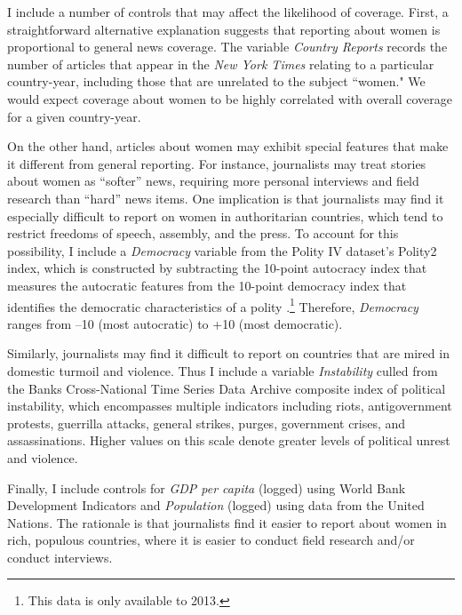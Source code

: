 \documentclass[11pt, oneside]{article}
\begin{document}
I include a number of controls that may affect the likelihood of coverage. First, a straightforward alternative explanation suggests that reporting about women is proportional to general news coverage. The variable \emph{Country Reports} records the number of articles that appear in the \emph{New York Times} relating to a particular country-year, including those that are unrelated to the subject ``women." We would expect coverage about women to be highly correlated with overall coverage for a given country-year.

On the other hand, articles about women may exhibit special features that make it different from general reporting. For instance, journalists may treat stories about women as ``softer'' news, requiring more personal interviews and field research than ``hard'' news items. One implication is that journalists may find it especially difficult to report on women in authoritarian countries, which tend to restrict freedoms of speech, assembly, and the press. To account for this possibility, I include a \emph{Democracy} variable from the Polity IV dataset's Polity2 index, which is constructed by subtracting the 10-point autocracy index that measures the autocratic features from the 10-point democracy index that identifies the democratic characteristics of a polity \cite{marshall2012}.\footnote{\hspace{5}This data is only available to 2013.} Therefore, \emph{Democracy} ranges from --10 (most autocratic) to +10 (most democratic). 

Similarly, journalists may find it difficult to report on countries that are mired in domestic turmoil and violence. Thus I include a variable \emph{Instability} culled from the Banks Cross-National Time Series Data Archive composite index of political instability, which encompasses multiple indicators including riots, antigovernment protests, guerrilla attacks, general strikes, purges, government crises, and assassinations. Higher values on this scale denote greater levels of political unrest and violence. 

Finally, I include controls for \emph{GDP per capita} (logged) using World Bank Development Indicators and \emph{Population} (logged) using data from the United Nations. The rationale is that journalists find it easier to report about women in rich, populous countries, where it is easier to conduct field research and/or conduct interviews. 
\end{document}
